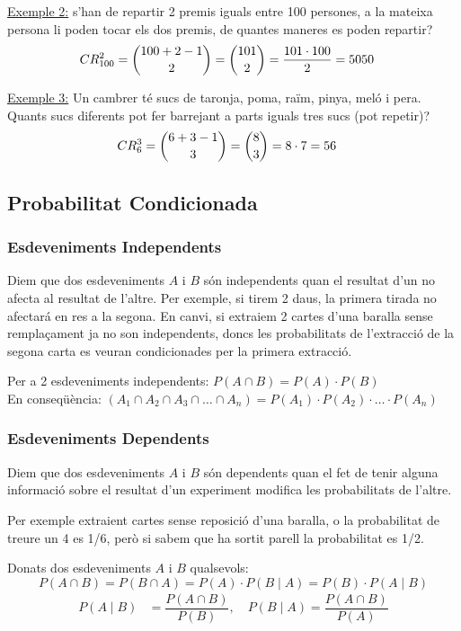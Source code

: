\documentclass{article}
\begin{document}
\underline{Exemple 2:} s'han de repartir 2 premis iguals entre 100 persones, a la mateixa persona li poden tocar els dos premis, de quantes maneres es poden repartir?
\begin{align*}
CR_{100}^{2} & = \dbinom{100 + 2 - 1}{2}= \dbinom{101}{2} =  \dfrac{101 \cdot 100}{2} = 5050
\end{align*}

\underline{Exemple 3:} Un cambrer té sucs de taronja, poma, raïm, pinya, meló i pera. Quants sucs diferents pot fer barrejant a parts iguals tres sucs (pot repetir)?
\begin{align*}
CR_{6}^{3} & = \dbinom{6 + 3 - 1}{3} = \dbinom{8}{3} = 8 \cdot 7 = 56 
\end{align*}

\subsection{Probabilitat Condicionada}

\subsubsection{Esdeveniments Independents}
Diem que dos esdeveniments $A$ i $B$ són independents quan el resultat d'un no afecta al resultat de l'altre. Per exemple, si tirem 2 daus, la primera tirada no afectará en res a la segona. En canvi, si extraiem 2 cartes d'una baralla sense remplaçament ja no son independents, doncs les probabilitats de l'extracció de la segona carta es veuran condicionades per la primera extracció.

Per a 2 esdeveniments independents: $P(A \cap B) = P(A)\cdot P(B)$ \\
En conseqüència: $(A_1 \cap A_2 \cap A_3 \cap \ldots \cap A_n) = P(A_1) \cdot P(A_2) \cdot \ldots \cdot P(A_n)$

\subsubsection{Esdeveniments Dependents}
Diem que dos esdeveniments $A$ i $B$ són dependents quan el fet de tenir alguna informació sobre el resultat d’un experiment modifica les probabilitats de l'altre.

Per exemple extraient cartes sense reposició d'una baralla, o la probabilitat de treure un 4 es 1/6, però si sabem que ha sortit parell la probabilitat es 1/2.

Donats dos esdeveniments $A$ i $B$ qualsevols: 
\begin{equation}
P(A\cap B) = P(B\cap A) = P(A)\cdot P(B\mid A) = P(B)\cdot P(A\mid B)
\end{equation} \label{eqn:condicionada}
\begin{align*}
P(A\mid B) &= \dfrac{P(A\cap B)}{P(B)} , \quad P(B\mid A) = \dfrac{P(A\cap B)}{P(A)}
\end{align*}
\end{document}
